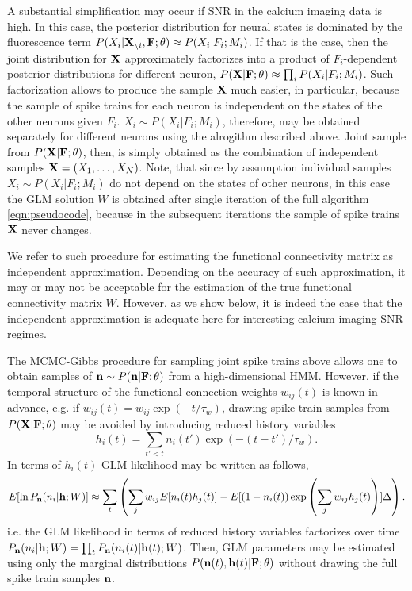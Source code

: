 A substantial simplification may occur if SNR in the calcium imaging data is high. In this case, the posterior distribution for neural states is dominated by the fluorescence term $P(X_i|{\bf X}_{\backslash i},{\bf F};\theta)\approx P(X_i|F_i;M_i)$. If that is the case, then the joint distribution for ${\bf X}$ approximately factorizes into a product of $F_i$-dependent posterior distributions for different neuron, $P({\bf X}|{\bf F};\theta)\approx\prod_i P(X_i|F_i; M_i)$. Such factorization allows to produce the sample ${\bf X}$ much easier, in particular, because the sample of spike trains for each neuron is independent on the states of the other neurons given $F_i$. $X_i\sim P(X_i|F_i;M_i)$, therefore, may be obtained separately for different neurons using the alrogithm described above. Joint sample from $P({\bf X}|{\bf F};\theta)$, then, is simply obtained as the combination of independent samples ${\bf X}=(X_1,\ldots,X_N)$.
Note, that since by assumption individual samples $X_i\sim P(X_i|F_i;M_i)$ do not depend on the states of other neurons, in this case the GLM solution $W$ is obtained after single iteration of the full algorithm \ref{eqn:pseudocode}, because in the subsequent iterations the sample of spike trains ${\bf X}$ never changes.

We refer to such procedure for estimating the functional connectivity matrix as independent approximation. Depending on the accuracy of such approximation, it may or may not be acceptable for the estimation of the true functional connectivity matrix $W$. However, as we show below, it is indeed the case that the independent approximation is adequate here for interesting calcium imaging SNR regimes.

The MCMC-Gibbs procedure for sampling joint spike trains above allows one to obtain samples of ${\bf n}\sim P({\bf n}|{\bf F}; \mathbf{\theta})$ from a high-dimensional HMM. However, if the temporal structure of the functional connection weights $w_{ij}(t)$ is known in advance, e.g. if $w_{ij}(t)=w_{ij}\exp(-t/\tau_w)$, drawing spike train samples from $P({\bf X}|{\bf F};\mathbf{\theta})$ may be avoided by introducing reduced history variables 
\begin{equation}
h_i(t)=\sum\limits_{t'<t} n_i(t')\exp(-(t-t')/\tau_w).
\end{equation}
In terms of $h_i(t)$ GLM likelihood may be written as follows, 
\begin{equation}
E[\ln P_{{\bf n}}(n_i|{\bf h}; W)]\approx \sum_t \left(\sum\limits_{j} w_{ij} E[n_i(t) h_j(t)] -
E[(1-n_i(t)) \exp\left(\sum\limits_j w_{ij}h_j(t)\right)] \Delta \right). 
\end{equation}
i.e. the GLM likelihood in terms of reduced history variables factorizes over time $P_{{\bf n}}(n_i|{\bf h};W)=\prod_t P_{{\bf n}}(n_i(t)|{\bf h}(t);W)$.
Then, GLM parameters may be estimated using only the marginal distributions $P({\bf n}(t), {\bf h}(t)|{\bf F};\mathbf{\theta})$ without drawing the full spike train samples ${\bf n}$.

